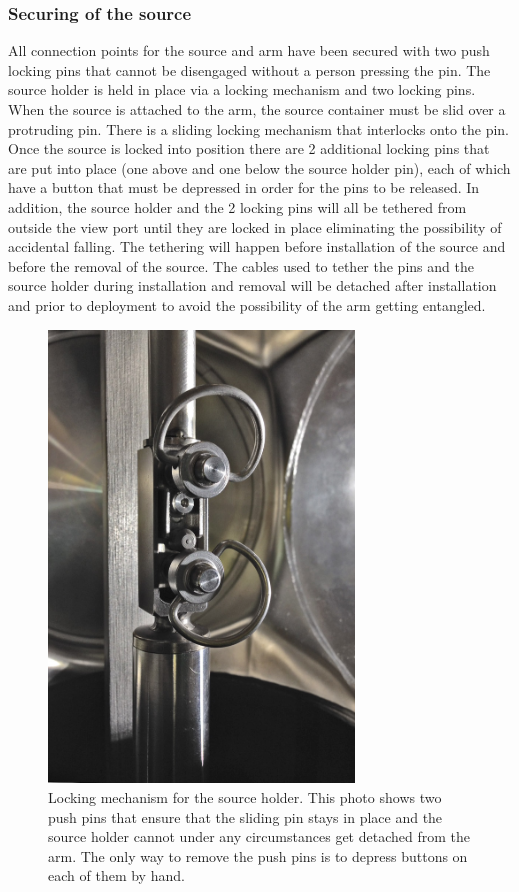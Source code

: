 \subsubsection{Securing of the source}
All connection points for the source and arm have been secured with two push locking pins that cannot be disengaged without a person pressing the pin. 
The source holder is held in place via a locking mechanism and two locking pins. When the source is attached to the arm, the source container must be slid over a protruding pin. There is a sliding locking mechanism that interlocks onto the pin. Once the source is locked into position there are 2 additional locking pins that are put into place (one above and one below the source holder pin), each of which have a button that must be depressed in order for the pins to be released. In addition, the source holder and the 2 locking pins will all be tethered from outside the view port until they are locked in place eliminating the possibility of accidental falling.  The tethering will happen before installation of the source and before the removal of the source. The cables used to tether the pins and the source holder during installation and removal will be detached after installation and prior to deployment to avoid the possibility of the arm getting entangled.  
 
\begin{figure}[htbp]
 \centering
 \includegraphics[width=3.2in]{Figures/sourceHolder_locking}
 \caption{Locking mechanism for the source holder. This photo shows two push pins that ensure that the sliding pin stays in place and the source holder cannot under any circumstances get detached from the arm.  The only way to remove the push pins is to depress buttons on each of them by hand.}
 \label{fig:sourceHolder_locking}
\end{figure}

